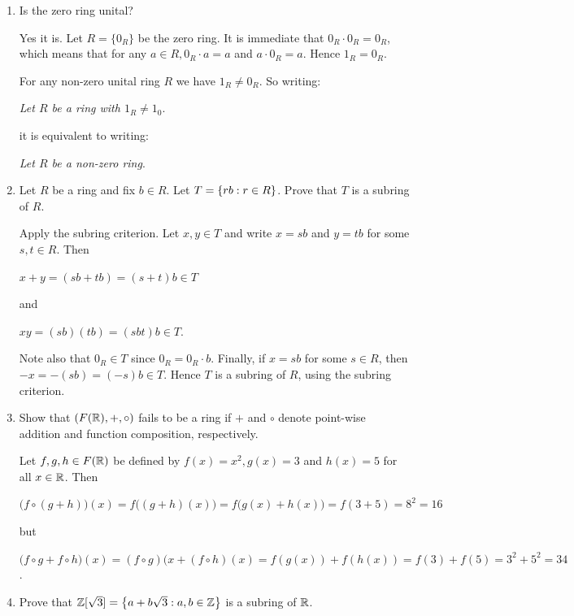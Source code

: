 \documentclass[11pt,fleqn,dvipsnames,usenames]{article}
\begin{document}
\begin{enumerate}[1.]
\item Is the zero ring unital?
\vsmsp

\solution Yes it is.  Let $R = \{0_{R}\}$ be the zero ring.  It is immediate that $0_{R}\cdot 0_{R} = 0_{R}$, which means that for any $a\in R, 0_{R}\cdot a = a$ and $a \cdot 0_{R} = a$.  Hence $1_{R} = 0_{R}$.
\vsp

\note For any non-zero unital ring $R$ we have $1_{R}\neq 0_{R}$.  So writing:
\begin{center}
\textit{Let $R$ be a ring with $1_{R}\neq 1_{0}$}.
\end{center}
it is equivalent to writing:
\begin{center}
\textit{Let $R$ be a non-zero ring}.
\end{center}

\item Let $R$ be a ring and fix $b\in R$.  Let $T = \left\{rb:r\in R\right\}$.  Prove that $T$ is a subring of $R$.
\vsmsp

\solution Apply the subring criterion.  Let $x,y\in T$ and write $x = sb$ and $y = tb$ for some $s,t\in R$.  Then
\begin{center}
$x+y = (sb + tb) = (s+t)b\in T$
\end{center}
and
\begin{center}
$xy = (sb)(tb) = (sbt)b\in T$.
\end{center}

Note also that $0_{R}\in T$ since $0_{R} = 0_{R}\cdot b$.  Finally, if $x = sb$ for some $s\in R$, then $-x = -(sb) = (-s)b\in T$.  Hence $T$ is a subring of $R$, using the subring criterion.

\item Show that $(F(\mathbb{R}),+,\circ)$ fails to be a ring if $+$ and $\circ$ denote point-wise addition and function composition, respectively.
\vsmsp

\solution Let $f,g,h\in F(\mathbb{R})$ be defined by $f(x) = x^2, g(x) = 3$ and $h(x) = 5$ for all $x\in\mathbb{R}$.  Then
\begin{center}
$\big(f\circ (g+h)\big)(x) = f\big((g+h)(x)\big) = f\big(g(x) + h(x)\big) = f(3 + 5) = 8^2 = 16$
\end{center}
but
\begin{center}
$\big(f\circ g + f\circ h\big)(x) = (f\circ g)(x + (f\circ h)(x) = f(g(x)) + f(h(x)) = f(3) + f(5) = 3^2 + 5^2 = 34$.
\end{center}
\item Prove that $\mathbb{Z}[\sqrt{3}] = \left\{a + b\sqrt{3}:a,b\in\mathbb{Z}\right\}$ is a subring of $\mathbb{R}$.
\vsmsp


\end{enumerate}
\end{document}
